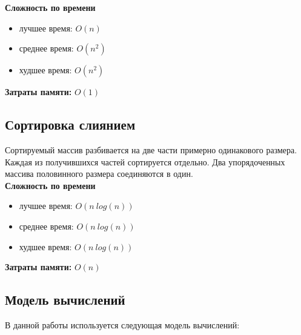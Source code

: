 \textbf{Сложность по времени}

\begin{itemize}
    \item лучшее время: $O(n)$
    \item среднее время: $O(n^2)$
    \item худшее время: $O(n^2)$
\end{itemize}

\textbf{Затраты памяти:} $O(1)$


\subsection{Сортировка слиянием}

Сортируемый массив разбивается на две части примерно одинакового размера.
Каждая из получившихся частей сортируется отдельно.
Два упорядоченных массива половинного размера соединяются в один.
\\

\textbf{Сложность по времени}

\begin{itemize}
    \item лучшее время: $O(n \ log(n))$
    \item среднее время: $O(n \ log(n))$
    \item худшее время: $O(n \ log(n))$
\end{itemize}

\textbf{Затраты памяти:} $O(n)$



\subsection{Модель вычислений}

В данной работы используется следующая модель вычислений:

